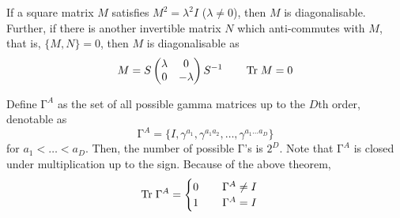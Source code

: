 \begin{thm}
	If a square matrix $M$ satisfies $M^2=\lambda ^2I$ ($\lambda \ne 0$), then $M$ is diagonalisable. Further, if there is another invertible matrix $N$ which anti-commutes with $M$, that is, $\{M,N\}=0$, then $M$ is diagonalisable as
\[M=S\begin{pmatrix}
	\lambda &0\\0&-\lambda 
\end{pmatrix}S^{-1}\hspace{5ex}\mathrm{Tr}\;M=0
\]
\end{thm}
\vspace{2ex}
\begin{defi}
Define $\mathrm{\Gamma} ^{A}$ as the set of all possible gamma matrices up to the $D$th order, denotable as
\[\mathrm{\Gamma} ^{A}=\{I,\gamma ^{a_1},\gamma ^{a_1a_2},\ldots ,\gamma ^{a_{1}\ldots a_{D}} \}\]
for $a_1<\ldots <a_{D}$. Then, the number of possible $\mathrm{\Gamma} $'s is $2^{D}$. Note that $\mathrm{\Gamma} ^{A}$ is closed under multiplication up to the sign. Because of the above theorem, 
\[\mathrm{Tr}\;\mathrm{\Gamma} ^{A}=\begin{cases}
0\hspace{5ex}\mathrm{\Gamma} ^{A}\ne I\\
1\hspace{5ex}\mathrm{\Gamma} ^{A}=I
\end{cases}\]

\end{defi}
\vspace{2ex}

